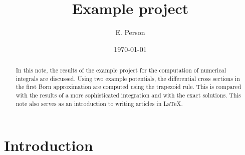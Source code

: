 \documentclass{project}
\title{Example project}
\author{E. Person}
\date{\today}
\begin{document}
\hypersetup{pageanchor=false}
\begin{titlingpage}
\maketitle

\begin{abstract}
In this note, the results of the example project for the computation of numerical integrals are discussed. Using two example potentials, the differential cross sections in the first Born approximation are computed using the trapezoid rule. This is compared with the results of a more sophisticated integration and with the exact solutions. This note also serves as an introduction to writing articles in \LaTeX.
\end{abstract}

\end{titlingpage}
\hypersetup{pageanchor=true}



\section{Introduction}
\end{document}
